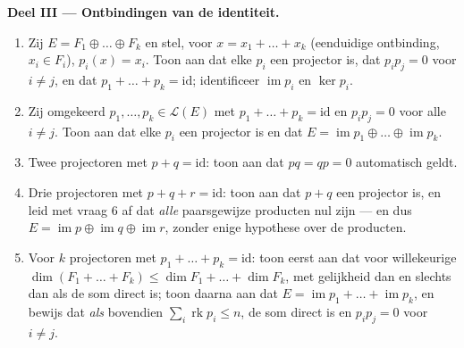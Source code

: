 \begin{problem}
\medskip
\noindent\textbf{Deel III --- Ontbindingen van de identiteit.}
\begin{enumerate}[resume]
  \item Zij $E = F_1 \oplus \dots \oplus F_k$ en stel, voor $x =
        x_1 + \dots + x_k$ (eenduidige ontbinding, $x_i \in F_i$),
        $p_i(x) = x_i$. Toon aan dat elke $p_i$ een projector is,
        dat $p_i p_j = 0$ voor $i \neq j$, en dat $p_1 + \dots +
        p_k = \mathrm{id}$; identificeer $\operatorname{im} p_i$ en
        $\ker p_i$.
  \item Zij omgekeerd $p_1, \dots, p_k \in \mathcal{L}(E)$ met $p_1
        + \dots + p_k = \mathrm{id}$ en $p_i p_j = 0$ voor alle $i
        \neq j$. Toon aan dat elke $p_i$ een projector is en dat $E
        = \operatorname{im} p_1 \oplus \dots \oplus
        \operatorname{im} p_k$.
  \item Twee projectoren met $p + q = \mathrm{id}$: toon aan dat
        $pq = qp = 0$ automatisch geldt.
  \item Drie projectoren met $p + q + r = \mathrm{id}$: toon aan
        dat $p + q$ een projector is, en leid met vraag 6 af dat
        \emph{alle} paarsgewijze producten nul zijn --- en dus $E =
        \operatorname{im} p \oplus \operatorname{im} q \oplus
        \operatorname{im} r$, zonder enige hypothese over de
        producten.
  \item Voor $k$ projectoren met $p_1 + \dots + p_k = \mathrm{id}$:
        toon eerst aan dat voor willekeurige  $\dim (F_1
        + \dots + F_k) \leq \dim F_1 + \dots + \dim F_k$, met
        gelijkheid dan en slechts dan als de som direct is; toon
        daarna aan dat $E = \operatorname{im} p_1 + \dots +
        \operatorname{im} p_k$, en bewijs dat \emph{als} bovendien
        $\sum_i \operatorname{rk} p_i \leq n$, de som direct is en
        $p_i p_j = 0$ voor $i \neq j$.
\end{enumerate}


\end{problem}
